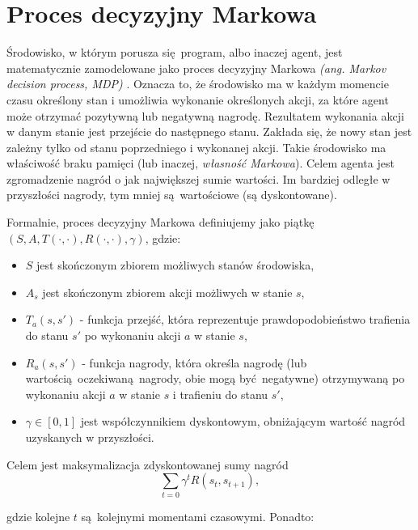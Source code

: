 \section{Proces decyzyjny Markowa}\label{mdp}

Środowisko, w którym porusza się program, albo inaczej agent, jest matematycznie zamodelowane jako proces decyzyjny Markowa \textit{(ang. Markov decision process, MDP)} \cite{bellman1954}. Oznacza to, że środowisko ma w każdym momencie czasu określony stan i umożliwia wykonanie określonych akcji, za które agent może otrzymać pozytywną lub negatywną nagrodę. Rezultatem wykonania akcji w danym stanie jest przejście do następnego stanu. Zakłada się, że nowy stan jest zależny tylko od stanu poprzedniego i wykonanej akcji. Takie środowisko ma właściwość braku pamięci (lub inaczej, \textit{własność Markowa}). Celem agenta jest zgromadzenie nagród o jak największej sumie wartości. Im bardziej odległe w przyszłości nagrody, tym mniej są wartościowe (są dyskontowane).

\vspace{5mm}

Formalnie, proces decyzyjny Markowa definiujemy jako piątkę $(S,A,T(\cdot,\cdot),R(\cdot,\cdot),\gamma)$, gdzie:
\begin{itemize}
\item $S$ jest skończonym zbiorem możliwych stanów środowiska,
\item $A_s$ jest skończonym zbiorem akcji możliwych w stanie $s$,
\item $T_a(s,s')$ - funkcja przejść, która reprezentuje prawdopodobieństwo trafienia do stanu $s'$ po wykonaniu akcji $a$ w stanie $s$,
\item $R_a(s,s')$ - funkcja nagrody, która określa nagrodę (lub wartością oczekiwaną nagrody, obie mogą być negatywne) otrzymywaną po wykonaniu akcji $a$ w stanie $s$ i trafieniu do stanu $s'$,
\item $\gamma \in [0,1]$ jest współczynnikiem dyskontowym, obniżającym wartość nagród uzyskanych w przyszłości.
\end{itemize}

Celem jest maksymalizacja zdyskontowanej sumy nagród $$\sum_{t=0}{\gamma^t R(s_t,s_{t+1})},$$

gdzie kolejne $t$ są kolejnymi momentami czasowymi. Ponadto:

